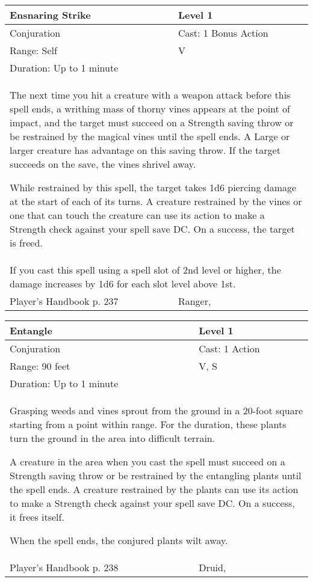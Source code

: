 \documentclass[11pt]{report}
\begin{document}
\begin{table}[H]
	\begin{tabular}{||p{6cm}|p{6cm}||}
		\hline\hline
		\bf{Ensnaring Strike} & Level 1\\ \hline
		Conjuration & Cast: 1 Bonus Action\\ \hline
		Range: Self & V\\ \hline
		Duration: Up to 1 minute & \\ \hline
		\multicolumn{2}{||p{12cm}||}{The next time you hit a creature with a weapon attack before this spell ends, a writhing mass of thorny vines appears at the point of impact, and the target must succeed on a Strength saving throw or be restrained by the magical vines until the spell ends. A Large or larger creature has advantage on this saving throw. If the target succeeds on the save, the vines shrivel away. 

While restrained by this spell, the target takes 1d6 piercing damage at the start of each of its turns. A creature restrained by the vines or one that can touch the creature can use its action to make a Strength check against your spell save DC. On a success, the target is freed.}\\ \hline
		\multicolumn{2}{||p{12cm}||}{If you cast this spell using a spell slot of 2nd level or higher, the damage increases by 1d6 for each slot level above 1st.}\\ \hline
Player's Handbook p. 237 & Ranger, \\ \hline\hline
	\end{tabular}
\end{table}

\begin{table}[H]
	\begin{tabular}{||p{6cm}|p{6cm}||}
		\hline\hline
		\bf{Entangle} & Level 1\\ \hline
		Conjuration & Cast: 1 Action\\ \hline
		Range: 90 feet & V, S\\ \hline
		Duration: Up to 1 minute & \\ \hline
		\multicolumn{2}{||p{12cm}||}{Grasping weeds and vines sprout from the ground in a 20-foot square starting from a point within range. For the duration, these plants turn the ground in the area into difficult terrain. 

A creature in the area when you cast the spell must succeed on a Strength saving throw or be restrained by the entangling plants until the spell ends. A creature restrained by the plants can use its action to make a Strength check against your spell save DC. On a success, it frees itself. 

When the spell ends, the conjured plants wilt away.}\\ \hline
Player's Handbook p. 238 & Druid, \\ \hline\hline
	\end{tabular}
\end{table}
\end{document}

